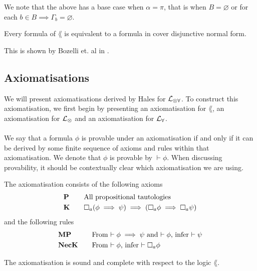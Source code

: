 We note that the above has a base case when $\alpha = \pi$, that is when $B = \varnothing$ or for
each $b \in B \implies \Gamma_b = \varnothing$.

\begin{lemma} \label{allInCoverNormal}
Every formula of $\lang$ is equivalent to a formula in cover disjunctive normal form.
\end{lemma}

This is shown by Bozelli et. al in \cite{DBLPjournalscorrabs12023538}.

\subsection{Axiomatisations}
We will present axiomatisations derived by Hales for $\mathcal{L}_{\otimes\forall}$.
To construct this axiomatisation, we first begin by presenting an axiomatisation for $\lang$, an
axiomatisation for $\mathcal{L}_{\otimes}$ and an axiomatisation for $\mathcal{L}_{\forall}$.\\
\\
We say that a formula $\phi$ is provable under an axiomatisation if and only if it can be derived by
some finite sequence of axioms and rules within that axiomatisation.
We denote that $\phi$ is provable by $\vdash \phi$.
When discussing provability, it should be contextually clear which axiomatisation we are using.

\begin{defn} \label{axiomK}
The axiomatisation \AXK consists of the following axioms
\begin{alignat*}{2}
	& {\bf P} && \quad \text{All propositional tautologies} \\
	& {\bf K} && \quad \Box_a(\phi \implies \psi) \implies (\Box_a \phi \implies \Box_a \psi)
\end{alignat*}
and the following rules
\begin{alignat*}{2}
	& {\bf MP} && \quad \text{From $\vdash \phi \implies \psi$ and $\vdash \phi$, infer $\vdash \psi$} \\
	& {\bf NecK} && \quad \text{From $\vdash \phi$, infer $\vdash \Box_a \phi$}
\end{alignat*}
\end{defn}

\begin{lemma} \label{axiomKSoundComplete}
The axiomatisation \AXK is sound and complete with respect to the logic $\lang$.
\end{lemma}

